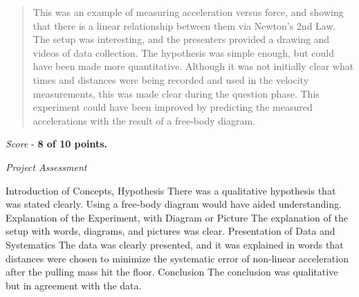 \documentclass[10pt]{article}
\begin{document}
\maketitle

\begin{abstract}
This was an example of measuring acceleration versus force, and showing that there is a linear relationship between them via Newton's 2nd Law.  The setup was interesting, and the presenters provided a drawing and videos of data collection.  The hypothesis was simple enough, but could have been made more quantitative.  Although it was not initially clear what times and distances were being recorded and used in the velocity measurements, this was made clear during the 	question phase.  This experiment could have been improved by predicting the measured accelerations with the result of a free-body diagram.
\end{abstract}

\textit{Score} - \textbf{8 of 10 points.}

\textit{Project Assessment}
\begin{outline}[enumerate]
\1 Introduction of Concepts, Hypothesis
\2 There was a qualitative hypothesis that was stated clearly.  Using a free-body diagram would have aided understanding.
\1 Explanation of the Experiment, with Diagram or Picture
\2 The explanation of the setup with words, diagrams, and pictures was clear.
\1 Presentation of Data and Systematics
\2 The data was clearly presented, and it was explained in words that distances were chosen to minimize the systematic error of non-linear acceleration after the pulling mass hit the floor.
\1 Conclusion
\2 The conclusion was qualitative but in agreement with the data.
\end{outline}
\end{document}
